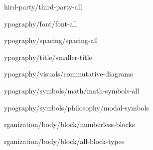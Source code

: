 
\def\loadOption #1{}

\loadOption third-party/third-party-all

\loadOption typography/font/font-all

\loadOption typography/spacing/spacing-all

\loadOption typography/title/smaller-title

\loadOption typography/visuals/commutative-diagrams

\loadOption typography/symbols/math/math-symbols-all

\loadOption typography/symbols/philosophy/modal-symbols

\loadOption organization/body/block/numberless-blocks

\loadOption organization/body/block/all-block-types
